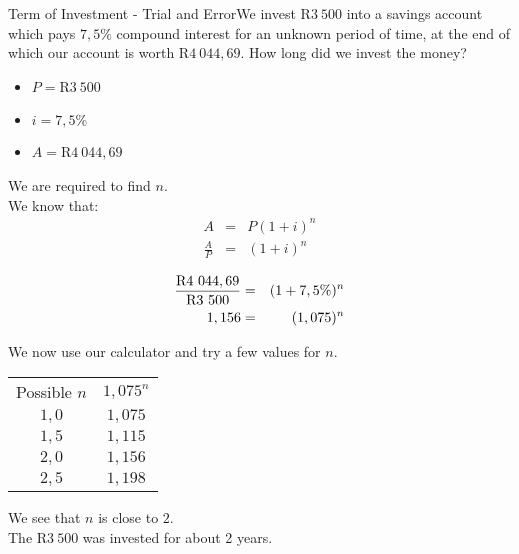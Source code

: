 \begin{wex}{Term of Investment - Trial and Error}{We invest R$3~500$ into a savings account which pays $7,5\%$ compound interest for an unknown period of time, at the end of which our account is worth R$4~044,69$. How long did we invest the money?\\}{
\begin{itemize}
\item{$P=$R$3~500$}
\item{$i=7,5\%$}
\item{$A=$R$4~044,69$}
\end{itemize}
We are required to find $n$.\\
We know that:
\begin{eqnarray*}
A &=& P(1+i)^n\\
\frac{A}{P}&=&(1+i)^n
\end{eqnarray*}

\begin{eqnarray*}
\frac{\rm{R}4~044,69}{\rm{R}3~500}&=&(1+7,5\%)^n\\
1,156&=&(1,075)^n
\end{eqnarray*}

We now use our calculator and try a few values for $n$.
\begin{center}
\begin{tabular}{|c|c|}\hline\hline
Possible $n$ & $1,075^n$\\
$1,0$ & $1,075$\\
$1,5$ & $1,115$\\
$2,0$ & $1,156$\\
$2,5$ & $1,198$\\
\end{tabular}
\end{center}
We see that $n$ is close to $2$.\\
The R$3~500$ was invested for about 2 years.}
\end{wex}

